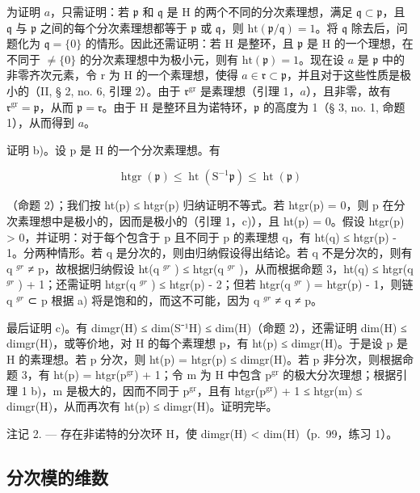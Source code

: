 为证明 \(a\)，只需证明：若 \(\mathfrak{p}\) 和 \(\mathfrak{q}\) 是 H 的两个不同的分次素理想，满足 \(\mathfrak{q} \subset \mathfrak{p}\)，且 \(\mathfrak{q}\) 与 \(\mathfrak{p}\) 之间的每个分次素理想都等于 \(\mathfrak{p}\) 或 \(\mathfrak{q}\)，则 \(\mathrm{ht}(\mathfrak{p}/\mathfrak{q}) = 1\)。将 \(\mathfrak{q}\) 除去后，问题化为 \(\mathfrak{q} = \{0\}\) 的情形。因此还需证明：若 H 是整环，且 \(\mathfrak{p}\) 是 H 的一个理想，在不同于 \(\neq \{0\}\) 的分次素理想中为极小元，则有 \(\mathrm{ht}(\mathfrak{p}) = 1\)。现在设 \(a\) 是 \(\mathfrak{p}\) 中的非零齐次元素，令 r 为 H 的一个素理想，使得 \(a \in \mathfrak{r} \subset \mathfrak{p}\)，并且对于这些性质是极小的（II, § 2, no. 6, 引理 2）。由于 \(\mathfrak{r}^{\mathrm{gr}}\) 是素理想（引理 1，\(a\)），且非零，故有 \(\mathfrak{r}^{\mathrm{gr}} = \mathfrak{p}\)，从而 \(\mathfrak{p} = \mathfrak{r}\)。由于 H 是整环且为诺特环，\(\mathfrak{p}\) 的高度为 1（§ 3, no. 1, 命题 1），从而得到 \(a\)。

证明 b)。设 p 是 H 的一个分次素理想。有

\[
\operatorname{htgr} (\mathfrak {p}) \leqslant \operatorname{ht} \left(\mathrm{S} ^ {- 1} \mathfrak {p}\right) \leqslant \operatorname{ht} (\mathfrak {p})
\]

（命题 2）；我们按 ht(p) ≤ htgr(p) 归纳证明不等式。若 htgr(p) = 0，则 p 在分次素理想中是极小的，因而是极小的（引理 1，c)），且 ht(p) = 0。假设 htgr(p) \textgreater{} 0，并证明：对于每个包含于 p 且不同于 p 的素理想 q，有 ht(q) ≤ htgr(p) - 1。分两种情形。若 q 是分次的，则由归纳假设得出结论。若 q 不是分次的，则有 q \(^{gr}\) ≠ p，故根据归纳假设 ht(q \(^{gr}\) ) ≤ htgr(q \(^{gr}\) )，从而根据命题 3，ht(q) ≤ htgr(q \(^{gr}\) ) + 1；还需证明 htgr(q \(^{gr}\) ) ≤ htgr(p) - 2；但若 htgr(q \(^{gr}\) ) = htgr(p) - 1，则链 q \(^{gr}\) ⊂ p 根据 a) 将是饱和的，而这不可能，因为 q \(^{gr}\) ≠ q ≠ p。

最后证明 c)。有 dimgr(H) ≤ dim(S⁻¹H) ≤ dim(H)（命题 2），还需证明 dim(H) ≤ dimgr(H)，或等价地，对 H 的每个素理想 p，有 ht(p) ≤ dimgr(H)。于是设 p 是 H 的素理想。若 p 分次，则 ht(p) = htgr(p) ≤ dimgr(H)。若 p 非分次，则根据命题 3，有 ht(p) = htgr(p\(^{\mathrm{gr}}\)) + 1；令 m 为 H 中包含 p\(^{\mathrm{gr}}\) 的极大分次理想；根据引理 1 b)，m 是极大的，因而不同于 p\(^{\mathrm{gr}}\)，且有 htgr(p\(^{\mathrm{gr}}\)) + 1 ≤ htgr(m) ≤ dimgr(H)，从而再次有 ht(p) ≤ dimgr(H)。证明完毕。

注记 2. --- 存在非诺特的分次环 H，使 dimgr(H) \textless{} dim(H)（p.~99，练习 1）。

\subsection{分次模的维数}

